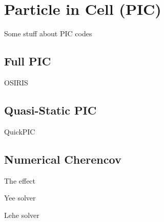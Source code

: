 %
%

\chapter{Particle in Cell (PIC)}
\label{Apx:PIC}

Some stuff about PIC codes

\section{Full PIC}
\label{PIC:Full}
OSIRIS \cite{fonseca:2002, add:fonseca:2017}

\section{Quasi-Static PIC}
\label{PIC:QS}
QuickPIC \cite{an:2013, huang:2006}


\section{Numerical Cherencov}
\label{PIC:NumCher}

The effect \cite{godfrey:1974, greenwood:2004}

Yee solver \cite{yee:1966}

Lehe solver \cite{lehe:2013}
